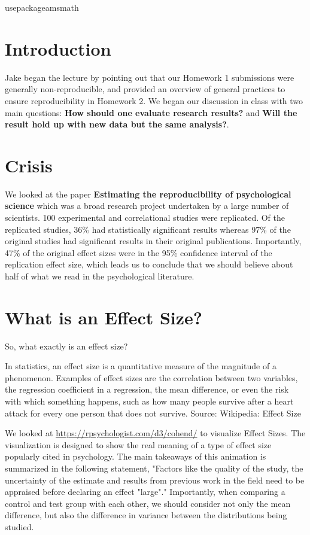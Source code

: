 
usepackage{amsmath}

\section{Introduction}
Jake began the lecture by pointing out that our Homework 1 submissions were generally non-reproducible, and provided an overview of general practices to ensure reproducibility in Homework 2. We began our discussion in class with two main questions: \textbf{How should one evaluate research results?} and \textbf{Will the result hold up with new data but the same analysis?}.

\section{Crisis}
We looked at the paper \textbf{Estimating the reproducibility of psychological science} which was a broad research project undertaken by a large number of scientists. 100 experimental and correlational studies were replicated. Of the replicated studies, 36\% had statistically significant results whereas 97\% of the original studies had significant results in their original publications. Importantly, 47\% of the original effect sizes were in the 95\% confidence interval of the replication effect size, which leads us to conclude that we should believe about half of what we read in the psychological literature. 

\section{What is an Effect Size?}
So, what exactly is an effect size? 

In statistics, an effect size is a quantitative measure of the magnitude of a phenomenon. Examples of effect sizes are the correlation between two variables, the regression coefficient in a regression, the mean difference, or even the risk with which something happens, such as how many people survive after a heart attack for every one person that does not survive. Source: Wikipedia: Effect Size 

We looked at \url{https://rpsychologist.com/d3/cohend/} to visualize Effect Sizes. The visualization is designed to show the real meaning of a type of effect size popularly cited in psychology. The main takeaways of this animation is summarized in the following statement, "Factors like the quality of the study, the uncertainty of the estimate and results from previous work in the field need to be appraised before declaring an effect "large"." Importantly, when comparing a control and test group with each other, we should consider not only the mean difference, but also the difference in variance between the distributions being studied. 

